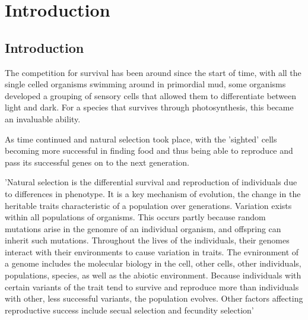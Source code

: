 
\chapter{Introduction} %

\label{Chapter1} %


\newcommand{\keyword}[1]{\textbf{#1}}
\newcommand{\tabhead}[1]{\textbf{#1}}
\newcommand{\code}[1]{\texttt{#1}}
\newcommand{\file}[1]{\texttt{\bfseries#1}}
\newcommand{\option}[1]{\texttt{\itshape#1}}


\section{Introduction}

The competition for survival has been around since the start of time, with all the single celled organisms swimming around in primordial mud, some organisms developed a grouping of sensory cells that allowed them to differentiate between light and dark. For a species that survives through photosynthesis, this became an invaluable ability.

As time continued and natural selection took place, with the 'sighted' cells becoming more successful in finding food and thus being able to reproduce and pass its successful genes on to the next generation. 

'Natural selection is the differential survival and reproduction of individuals due to differences in phenotype. It is a key mechanism of evolution, the change in the heritable traits characteristic of a population over generations. Variation exists within all populations of organisms. This occurs partly because random mutations arise in the genomre of an individual organism, and offspring can inherit such mutations. Throughout the lives of the individuals, their genomes interact with their environments to cause variation in traits. The evnironment of a genome includes the molecular biology in the cell, other cells, other individuals, populations, species, as well as the abiotic environment. Because individuals with certain variants of the trait tend to survive and reproduce more than individuals with other, less successful variants, the population evolves. Other factors affecting reproductive success include secual selection and fecundity selection'

